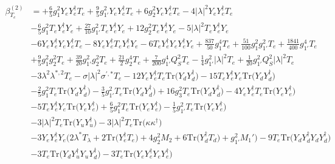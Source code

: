 {\begin{align}
\beta_{T_e}^{(2)} & =  
+\frac{6}{5} g_{1}^{2} {Y_e  Y_{e}^{\dagger}  T_e} +\frac{9}{5} g_{1'}^{2} {Y_e  Y_{e}^{\dagger}  T_e} +6 g_{2}^{2} {Y_e  Y_{e}^{\dagger}  T_e} -4 |\lambda|^2 {Y_e  Y_{e}^{\dagger}  T_e} \nonumber \\ 
 &-\frac{6}{5} g_{1}^{2} {T_e  Y_{e}^{\dagger}  Y_e} +\frac{27}{10} g_{1'}^{2} {T_e  Y_{e}^{\dagger}  Y_e} +12 g_{2}^{2} {T_e  Y_{e}^{\dagger}  Y_e} -5 |\lambda|^2 {T_e  Y_{e}^{\dagger}  Y_e} \nonumber \\ 
 &-6 {Y_e  Y_{e}^{\dagger}  Y_e  Y_{e}^{\dagger}  T_e} -8 {Y_e  Y_{e}^{\dagger}  T_e  Y_{e}^{\dagger}  Y_e} -6 {T_e  Y_{e}^{\dagger}  Y_e  Y_{e}^{\dagger}  Y_e} +\frac{837}{50} g_{1}^{4} T_e +\frac{51}{100} g_{1}^{2} g_{1'}^{2} T_e +\frac{1841}{400} g_{1'}^{4} T_e \nonumber \\ 
 &+\frac{9}{5} g_{1}^{2} g_{2}^{2} T_e +\frac{39}{20} g_{1'}^{2} g_{2}^{2} T_e +\frac{21}{2} g_{2}^{4} T_e +\frac{7}{200} g_{1'}^{4} Q_{S}^{2} T_e -\frac{1}{4} g_{1'}^{2} |\lambda|^2 T_e +\frac{1}{20} g_{1'}^{2} Q_{S}^{2} |\lambda|^2 T_e \nonumber \\ 
 &-3 \lambda^{2} \lambda^{*,2} T_e - \sigma |\lambda|^2 \sigma^{\prime,*} T_e -12 {Y_e  Y_{e}^{\dagger}  T_e} \mbox{Tr}\Big({Y_d  Y_{d}^{\dagger}}\Big) -15 {T_e  Y_{e}^{\dagger}  Y_e} \mbox{Tr}\Big({Y_d  Y_{d}^{\dagger}}\Big) \nonumber \\ 
 &-\frac{2}{5} g_{1}^{2} T_e \mbox{Tr}\Big({Y_d  Y_{d}^{\dagger}}\Big) -\frac{3}{5} g_{1'}^{2} T_e \mbox{Tr}\Big({Y_d  Y_{d}^{\dagger}}\Big) +16 g_{3}^{2} T_e \mbox{Tr}\Big({Y_d  Y_{d}^{\dagger}}\Big) -4 {Y_e  Y_{e}^{\dagger}  T_e} \mbox{Tr}\Big({Y_e  Y_{e}^{\dagger}}\Big) \nonumber \\ 
 &-5 {T_e  Y_{e}^{\dagger}  Y_e} \mbox{Tr}\Big({Y_e  Y_{e}^{\dagger}}\Big) +\frac{6}{5} g_{1}^{2} T_e \mbox{Tr}\Big({Y_e  Y_{e}^{\dagger}}\Big) -\frac{1}{5} g_{1'}^{2} T_e \mbox{Tr}\Big({Y_e  Y_{e}^{\dagger}}\Big) \nonumber \\ 
 &-3 |\lambda|^2 T_e \mbox{Tr}\Big({Y_u  Y_{u}^{\dagger}}\Big) -3 |\lambda|^2 T_e \mbox{Tr}\Big({\kappa  \kappa^{\dagger}}\Big) \nonumber \\ 
 &-3 {Y_e  Y_{e}^{\dagger}  Y_e} \Big(2 \lambda^* T_{\lambda}  + 2 \mbox{Tr}\Big({Y_{e}^{\dagger}  T_e}\Big)  + 4 g_{2}^{2} M_2  + 6 \mbox{Tr}\Big({Y_{d}^{\dagger}  T_d}\Big)  + g_{1'}^{2} M_1' \Big)-9 T_e \mbox{Tr}\Big({Y_d  Y_{d}^{\dagger}  Y_d  Y_{d}^{\dagger}}\Big) \nonumber \\ 
 &-3 T_e \mbox{Tr}\Big({Y_d  Y_{u}^{\dagger}  Y_u  Y_{d}^{\dagger}}\Big) -3 T_e \mbox{Tr}\Big({Y_e  Y_{e}^{\dagger}  Y_e  Y_{e}^{\dagger}}\Big) \nonumber \\ 

\end{align}}
